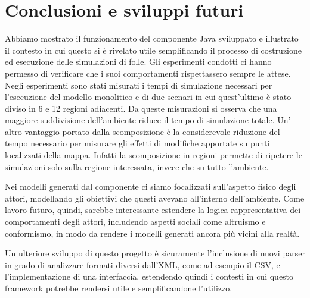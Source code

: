 \chapter{Conclusioni e sviluppi futuri}
Abbiamo mostrato il funzionamento del componente Java sviluppato e illustrato il contesto in cui questo si è rivelato utile semplificando il processo di costruzione ed esecuzione delle simulazioni di folle. Gli esperimenti condotti ci hanno permesso di verificare che i suoi comportamenti rispettassero sempre le attese. Negli esperimenti sono stati misurati i tempi di simulazione necessari per l'esecuzione del modello monolitico e di due scenari in cui quest'ultimo è stato diviso in 6 e 12 regioni adiacenti. Da queste misurazioni si osserva che una maggiore suddivisione dell'ambiente riduce il tempo di simulazione totale. Un' altro vantaggio portato dalla scomposizione è la considerevole riduzione del tempo necessario per misurare gli effetti di modifiche apportate su punti localizzati della mappa. Infatti la scomposizione in regioni permette di ripetere le simulazioni solo sulla regione interessata, invece che su tutto l'ambiente. 

Nei modelli generati dal componente ci siamo focalizzati sull'aspetto fisico degli attori, modellando gli obiettivi che questi avevano all'interno dell'ambiente. Come lavoro futuro, quindi, sarebbe interessante estendere la logica rappresentativa dei comportamenti degli attori, includendo aspetti sociali come altruismo e conformismo, in modo da rendere i modelli generati ancora più vicini alla realtà. 

Un ulteriore sviluppo di questo progetto è sicuramente l'inclusione di nuovi parser in grado di analizzare formati diversi dall'XML, come ad esempio il CSV, e l'implementazione di una interfaccia, estendendo quindi i contesti in cui questo framework potrebbe rendersi utile e semplificandone l'utilizzo.